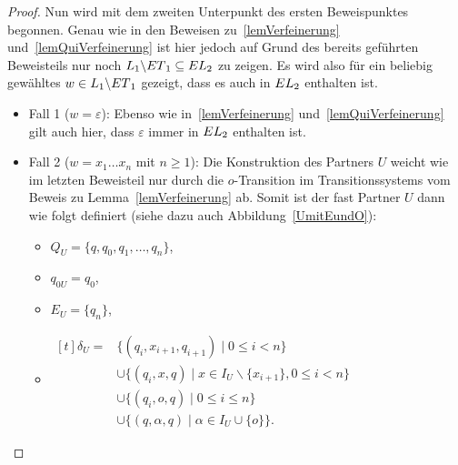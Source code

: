 \begin{proof}
  Nun wird mit dem zweiten Unterpunkt des ersten Beweispunktes begonnen. Genau
  wie in den Beweisen zu~\ref{lemVerfeinerung} und~\ref{lemQuiVerfeinerung} ist
  hier jedoch auf Grund des bereits geführten Beweisteils nur noch
  $L_1\backslash ET{}_1\subseteq EL{}_2$ zu zeigen. Es wird also für ein
  beliebig gewähltes $w\in L_1\backslash ET{}_1$ gezeigt, dass es auch in
  $EL{}_2$ enthalten ist.
  \begin{itemize}
    \item Fall 1 ($w=\varepsilon$): Ebenso wie in~\ref{lemVerfeinerung}
      und~\ref{lemQuiVerfeinerung} gilt auch hier, dass $\varepsilon$ immer in
      $EL{}_2$ enthalten ist.
    \item Fall 2 ($w=x_1\dots x_n$ mit $n\geq 1$): Die Konstruktion des
      Partners $U$ weicht wie im letzten Beweisteil nur durch die
      $o$-Transition im Transitionssystems vom Beweis zu
      Lemma~\ref{lemVerfeinerung} ab. Somit ist der fast Partner $U$ dann wie
      folgt definiert (siehe dazu auch Abbildung~\ref{UmitEundO}):
      \begin{itemize}
        \item $Q_U=\{q,q_0,q_1,\dots ,q_n\}$,
        \item $q_{0U}=q_0$,
        \item $E_U=\{q_n\}$,
        \item $\begin{aligned}[t]
            \delta _U=&\{(q_i,x_{i+1},q_{i+1})\mid 0\leq i< n\}\\
                      &\cup\{(q_i,x,q)\mid x\in I_U\backslash\{x_{i+1}\},0\leq
          i < n\}\\
          &\cup\{(q_i,o ,q)\mid 0\leq i\leq n\}\\
          &\cup\{(q,\alpha ,q)\mid \alpha\in I_U\cup \{o\}\}.
              \end{aligned}$
      \end{itemize}
      \begin{figure} [h!tbp]
      \begin{center}
\end{center}
\end{figure}
\end{itemize}
\end{proof}

